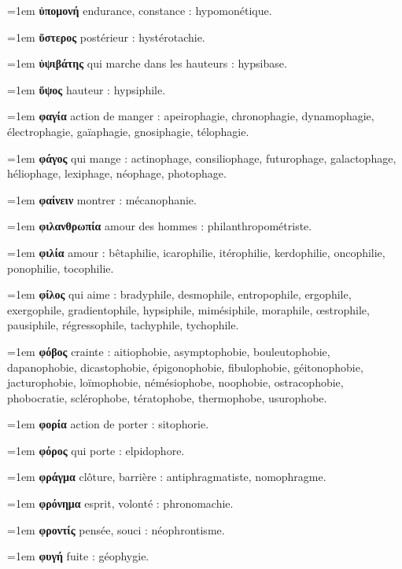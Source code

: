 \hangindent=1em \textbf{ὑπομονή} endurance, constance : hypomonétique.\par
\hangindent=1em \textbf{ὕστερος} postérieur : hystérotachie.\par
\hangindent=1em \textbf{ὑψιβάτης} qui marche dans les hauteurs : hypsibase.\par
\hangindent=1em \textbf{ὕψος} hauteur : hypsiphile.\par
\hangindent=1em \textbf{φαγία} action de manger : apeirophagie, chronophagie, dynamophagie, électrophagie, gaïaphagie, gnosiphagie, télophagie.\par
\hangindent=1em \textbf{φάγος} qui mange : actinophage, consiliophage, futurophage, galactophage, héliophage, lexiphage, néophage, photophage.\par
\hangindent=1em \textbf{φαίνειν} montrer : mécanophanie.\par
\hangindent=1em \textbf{φιλανθρωπία} amour des hommes : philanthropométriste.\par
\hangindent=1em \textbf{φιλία} amour : bêtaphilie, icarophilie, itérophilie, kerdophilie, oncophilie, ponophilie, tocophilie.\par
\hangindent=1em \textbf{φίλος} qui aime : bradyphile, desmophile, entropophile, ergophile, exergophile, gradientophile, hypsiphile, mimésiphile, moraphile, œstrophile, pausiphile, régressophile, tachyphile, tychophile.\par
\hangindent=1em \textbf{φόβος} crainte : aitiophobie, asymptophobie, bouleutophobie, dapanophobie, dicastophobie, épigonophobie, fibulophobie, géitonophobie, jacturophobie, loïmophobie, némésiophobe, noophobie, ostracophobie, phobocratie, sclérophobe, tératophobe, thermophobe, usurophobe.\par
\hangindent=1em \textbf{φορία} action de porter : sitophorie.\par
\hangindent=1em \textbf{φόρος} qui porte : elpidophore.\par
\hangindent=1em \textbf{φράγμα} clôture, barrière : antiphragmatiste, nomophragme.\par
\hangindent=1em \textbf{φρόνημα} esprit, volonté : phronomachie.\par
\hangindent=1em \textbf{φροντίς} pensée, souci : néophrontisme.\par
\hangindent=1em \textbf{φυγή} fuite : géophygie.\par
